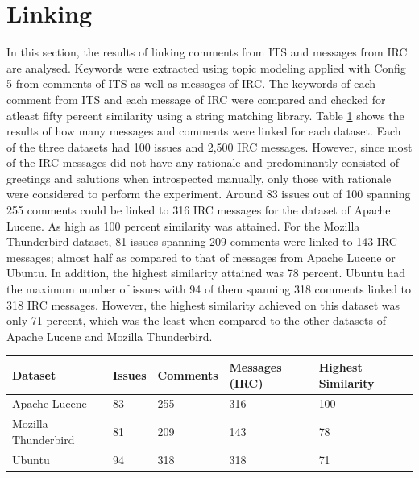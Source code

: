 \documentclass[a4paper,12pt,twoside]{report}
\begin{document}
\section{Linking}
In this section, the results of linking comments from ITS and messages from IRC are analysed. Keywords were extracted using topic modeling applied with Config 5 from comments of ITS as well as messages of IRC. The keywords of each comment from ITS and each message of IRC were compared and checked for atleast fifty percent similarity using a string matching library. Table \ref{tab:topicLinking} shows the results of how many messages and comments were linked for each dataset. 
\newline \newline
Each of the three datasets had 100 issues and 2,500 IRC messages. However, since most of the IRC messages did not have any rationale and predominantly consisted of greetings and salutions when introspected manually, only those with rationale were considered to perform the experiment. Around 83 issues out of 100 spanning 255 comments could be linked to 316 IRC messages for the dataset of Apache Lucene. As high as 100 percent similarity was attained. For the Mozilla Thunderbird dataset, 81 issues spanning 209 comments were linked to 143 IRC messages; almost half as compared to that of messages from Apache Lucene or Ubuntu. In addition, the highest similarity attained was 78 percent. Ubuntu had the maximum number of issues with 94 of them spanning 318 comments linked to 318 IRC messages. However, the highest similarity achieved on this dataset was only 71 percent, which was the least when compared to the other datasets of Apache Lucene and Mozilla Thunderbird. 
\begin{table} %
    \centering
    \begin{adjustbox}{max width=\columnwidth}
    \def\arraystretch{1} %
    \begin{tabular}{p{4cm} p{3cm} p{3cm} p{4cm} p{4cm}}
        \toprule
        \textbf{Dataset} & \textbf{Issues} & \textbf{Comments} & \textbf{Messages (IRC)} & \textbf{Highest Similarity}\\
        \midrule
			Apache Lucene & 83 & 255 & 316 & 100 \\
			Mozilla Thunderbird & 81 & 209 & 143 & 78 \\ 
			Ubuntu & 94 & 318 & 318 & 71 \\
        \midrule
    \end{tabular}
    \end{adjustbox}
    \label{tab:topicLinking}
\end{table}
\end{document}
